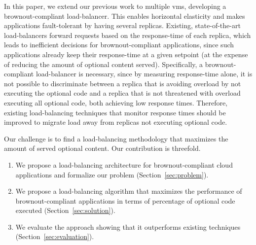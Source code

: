 In this paper, we extend our previous work to multiple \acp{vm},
developing a brownout-compliant load-balancer. This enables horizontal
elasticity and makes applications fault-tolerant by having several
replicas. Existing, state-of-the-art load-balancers forward requests
based on the response-time of each replica, which leads to inefficient
decisions for brownout-compliant applications, since such applications
already keep their response-time at a given setpoint (at the expense
of reducing the amount of optional content served). Specifically, a
brownout-compliant load-balancer is necessary, since by measuring
response-time alone, it is not possible to discriminate between a
replica that is avoiding overload by not executing the optional code
and a replica that is not threatened with overload executing all
optional code, both achieving low response times.  Therefore, existing
load-balancing techniques that monitor response times should be
improved to migrate load away from replicas not executing optional
code.

Our challenge is to find a load-balancing methodology that maximizes
the amount of served optional content. Our contribution is threefold.
\begin{enumerate}
\item We propose a load-balancing architecture for brownout-compliant
  cloud applications and formalize our problem
  (Section~\ref{sec:problem}).
\item We propose a load-balancing algorithm that maximizes the
  performance of brownout-compliant applications in terms of
  percentage of optional code executed (Section~\ref{sec:solution}).
\item We evaluate the approach showing that it outperforms existing
  techniques (Section~\ref{sec:evaluation}).
\end{enumerate}

